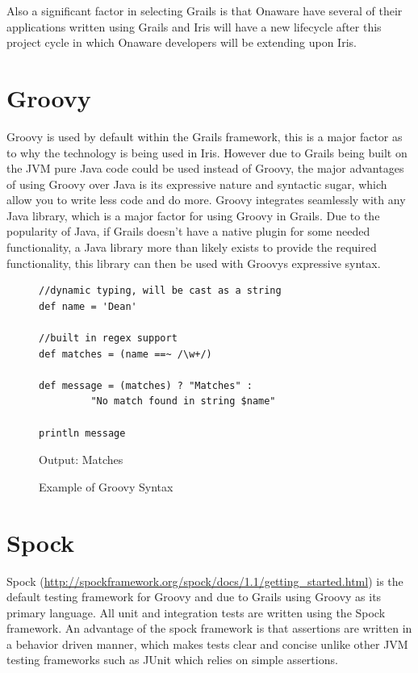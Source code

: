 \documentclass[12pt,a4paper,titlepage]{report}
\begin{document}
Also a significant factor in selecting Grails is that Onaware have several of their applications written using Grails and Iris will have a new lifecycle after this project cycle in which Onaware developers will be extending upon Iris. 

\section{Groovy}

Groovy is used by default within the Grails framework, this is a major factor as to why the technology is being used in Iris. However due to Grails being built on the JVM pure Java code could be used instead of Groovy, the major advantages of using Groovy over Java is its expressive nature and syntactic sugar, which allow you to write less code and do more. Groovy integrates seamlessly with any Java library, which is a major factor for using Groovy in Grails. Due to the popularity of Java, if Grails doesn’t have a native plugin for some needed functionality, a Java library more than likely exists to provide the required functionality, this library can then be used with Groovys expressive syntax.

\begin{figure}[H]
\begin{tcolorbox}
\begin{verbatim}
//dynamic typing, will be cast as a string
def name = 'Dean'

//built in regex support
def matches = (name ==~ /\w+/)   

def message = (matches) ? "Matches" :
		 "No match found in string $name"

println message
\end{verbatim}
Output:
Matches
\end{tcolorbox}
\caption{Example of Groovy Syntax}
\end{figure}

\section{Spock}
Spock (\url{http://spockframework.org/spock/docs/1.1/getting_started.html}) is the default testing framework for Groovy and due to Grails using Groovy as its primary language. All unit and integration tests are written using the Spock framework. An advantage of the spock framework is that assertions are written in a behavior driven manner, which makes tests clear and concise unlike other JVM testing frameworks such as JUnit which relies on simple assertions.
\end{document}
